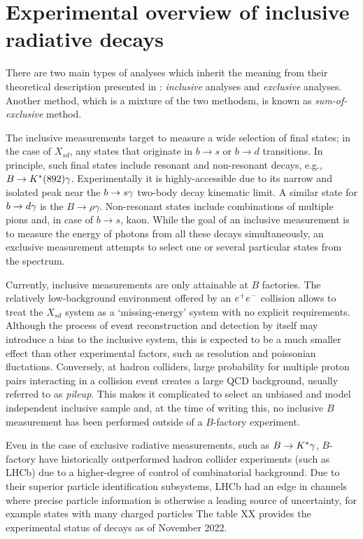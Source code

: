 \chapter{Experimental overview of inclusive radiative decays}

There are two main types of analyses which inherit the meaning from their theoretical description presented in : \textit{inclusive} analyses and \textit{exclusive} analyses.
Another method, which is a mixture of the two methodsm, is known as \textit{sum-of-exclusive} method.

The inclusive measurements target to measure a wide selection of final states; in the case of $X_{sd}$, any states that originate in $b\to s$ or $b\to d$ transitions.
In principle, such final states include resonant and non-resonant decays, e.g., $B\rightarrow K^*(892)\gamma$.
Experimentally it is highly-accessible due to its narrow and isolated peak near the $b\rightarrow s\gamma$ two-body decay kinematic limit.
A similar state for $b\rightarrow d\gamma$ is the $B\rightarrow \rho\gamma$.
Non-resonant states include combinations of multiple pions and, in case of $b\rightarrow s$, kaon.
While the goal of an inclusive measurement is to measure the energy of photons from all these decays simultaneously, an exclusive measurement attempts to select one or several particular states from the spectrum.

Currently, inclusive measurements are only attainable at $B$ factories.
The relatively low-background environment offered by an $e^+e^-$ collision allows to treat the $X_{sd}$ system as a `missing-energy' system with no explicit requirements.
Although the process of event reconstruction and detection by itself may introduce a bias to the inclusive system, this is expected to be a much smaller effect than other experimental factors, such as resolution and poissonian fluctations.
Conversely, at hadron colliders, large probability for multiple proton pairs interacting in a collision event creates a large QCD background, usually referred to as \textit{pileup}.
This makes it complicated to select an unbiased and model independent inclusive sample and,
at the time of writing this, no inclusive $B$ measurement has been performed outside of a $B$-factory experiment.

Even in the case of exclusive radiative measurements, such as $B\rightarrow K^*\gamma$, $B$-factory have historically outperformed hadron collider experiments (such as LHCb) due to a higher-degree of control of combinatorial background.
Due to their superior particle identification subsystems, LHCb had an edge in channels where precise particle information is otherwise a leading source of uncertainty, for example states with many charged particles
The table XX provides the experimental status of \BtoXsgamma decays as of November 2022.

